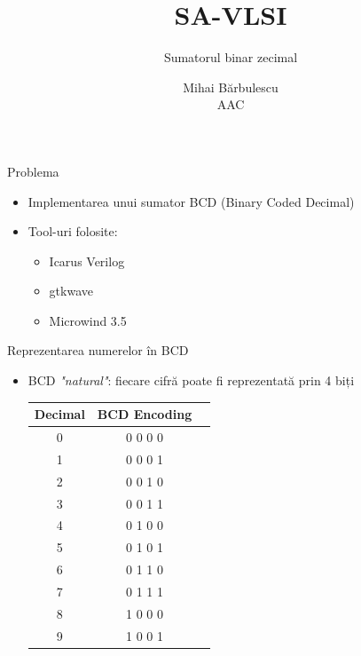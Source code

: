 \documentclass{beamer}
\title{\textbf{SA-VLSI}}
\subtitle{Sumatorul binar zecimal}
\author{Mihai Bărbulescu \\ AAC}
\begin{document}
\frame{\titlepage}

\begin{frame}{Problema}

\begin{itemize}
	\item Implementarea unui sumator BCD (Binary Coded Decimal)
	\item Tool-uri folosite:
	\begin{itemize}

		\item Icarus Verilog
		\item gtkwave
		\item Microwind 3.5
	\end{itemize}
\end{itemize}

\end{frame}

\begin{frame}{Reprezentarea numerelor în BCD}

\begin{itemize}
	\item BCD \emph{"natural"}: fiecare cifră poate fi reprezentată prin 4 biți

\begin{center}
  \begin{tabular}{| c | c | c |}
    \hline
	Decimal &	BCD Encoding \\ \hline
	0 &	0 0 0 0 \\ \hline 
	1 &	0 0 0 1 \\ \hline
	2 &	0 0 1 0 \\ \hline
	3 &	0 0 1 1 \\ \hline
	4 &	0 1 0 0\\ \hline
	5 &	0 1 0 1 \\ \hline
	6 &	0 1 1 0 \\ \hline
	7 &	0 1 1 1 \\ \hline
	8 &	1 0 0 0 \\ \hline
	9 &	1 0 0 1 \\
    \hline
  \end{tabular}
\end{center}
  \end{itemize}
\end{frame}
\end{document}
